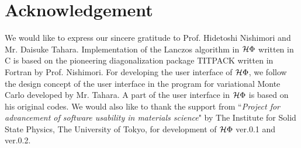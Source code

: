 \chapter{Acknowledgement}
We would like to express our sincere gratitude to Prof. Hidetoshi Nishimori and Mr. Daisuke Tahara.
Implementation of the Lanczos algorithm in $\mathcal{H} \Phi$ written in C is based on the
pioneering diagonalization package TITPACK written in Fortran by Prof. Nishimori.
For developing the user interface of $\mathcal{H} \Phi$, we follow the design concept of
the user interface in the program for variational Monte Carlo developed by Mr. Tahara.
A part of the user interface in $\mathcal{H} \Phi$ is based on his original codes.
We would also like to thank the support from ``{\it Project for advancement of software usability in materials science}" by The Institute for Solid State Physics,
The University of Tokyo, for development of $\mathcal{H} \Phi$ ver.0.1 and ver.0.2.
